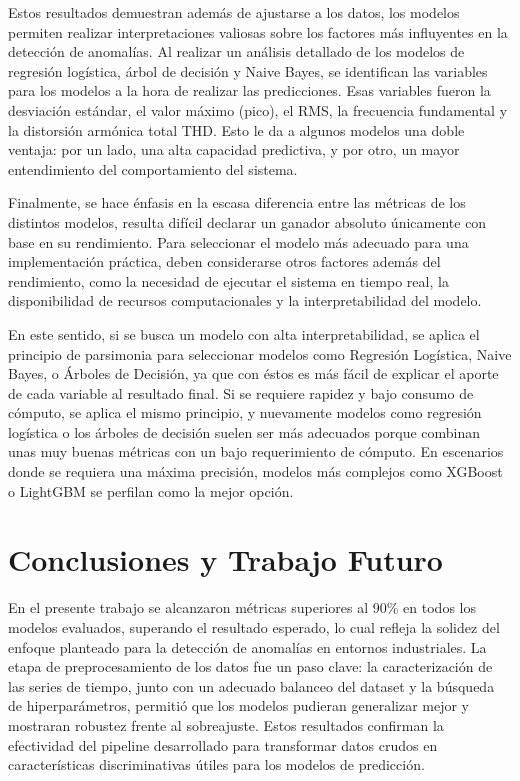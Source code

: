\documentclass[11pt,a4paper,spanish]{book}
\numberwithin{equation}{chapter}
\numberwithin{figure}{chapter}
\begin{document}
Estos resultados demuestran además de ajustarse a los datos, los modelos permiten 
realizar interpretaciones valiosas sobre los factores más influyentes en la detección 
de anomalías. 
Al realizar un análisis detallado de los modelos de regresión logística, árbol de 
decisión y Naive Bayes, se identifican las variables para los modelos a la hora de 
realizar las predicciones. Esas variables fueron la desviación estándar, el valor 
máximo (pico), el RMS, la frecuencia fundamental y la distorsión armónica total THD. 
Esto le da a algunos modelos una doble ventaja: por un lado, una alta capacidad 
predictiva, y por otro, un mayor entendimiento del comportamiento del sistema.


Finalmente, se hace énfasis en la escasa diferencia entre las métricas de los distintos
modelos, resulta difícil declarar un ganador absoluto únicamente con base en su 
rendimiento. 
Para seleccionar el modelo más adecuado para una implementación práctica, deben 
considerarse otros factores además del rendimiento, como la necesidad de ejecutar el 
sistema en tiempo real, la disponibilidad de recursos computacionales y la 
interpretabilidad del modelo. 


En este sentido,  si se busca un modelo con alta interpretabilidad, se aplica el 
principio de parsimonia para seleccionar modelos como Regresión Logística, Naive Bayes,
o Árboles de Decisión, ya que con éstos es  más fácil de explicar el aporte de cada 
variable al  resultado final.  
Si se requiere rapidez y bajo consumo de cómputo, se aplica el mismo principio, y 
nuevamente modelos como regresión logística o los árboles de decisión suelen ser más 
adecuados porque combinan unas muy buenas métricas con un bajo requerimiento de cómputo.
En escenarios donde se requiera una máxima precisión, modelos más complejos como 
XGBoost o LightGBM se perfilan como la mejor opción.



\chapter{Conclusiones y Trabajo Futuro}

En el presente  trabajo se alcanzaron métricas superiores al 90\% en todos los modelos
evaluados, superando el resultado esperado, lo cual refleja la solidez del enfoque 
planteado para la detección de anomalías en entornos industriales. La etapa de 
preprocesamiento de los datos fue un paso clave: la caracterización de las series de 
tiempo, junto con un adecuado balanceo del dataset y la búsqueda de hiperparámetros, 
permitió que los modelos pudieran generalizar mejor y mostraran robustez frente al 
sobreajuste. Estos resultados confirman la efectividad del pipeline desarrollado para 
transformar datos crudos en características discriminativas útiles para los modelos 
de predicción.
\end{document}
